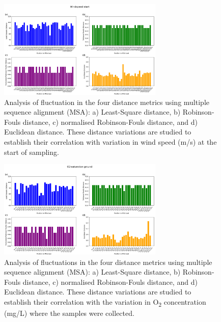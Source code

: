 \begin{figure}[]
    \centering
    \includegraphics[width=0.7\textwidth]{figure5.png}
    \caption{Analysis of fluctuation in the four distance metrics using multiple sequence alignment (MSA): a) Least-Square distance, b) Robinson-Fouls distance, c) normalised Robinson-Fouls distance, and d) Euclidean distance. These distance variations are studied to establish their correlation with variation in wind speed (m/s) at the start of sampling. \label{fig:fig5}}
\end{figure}

\begin{figure}[]
    \centering
    \includegraphics[width=0.7\textwidth]{figure6.png}
    \caption{Analysis of fluctuations in the four distance metrics using multiple sequence alignment (MSA): a) Least-Square distance, b) Robinson-Fouls distance, c) normalised Robinson-Fouls distance, and d) Euclidean distance. These distance variations are studied to establish their correlation with the variation in O\textsubscript{2} concentration (mg/L) where the samples were collected. \label{fig:fig6}}
\end{figure}

